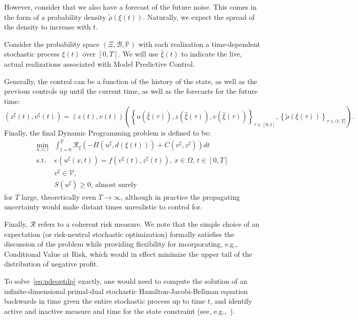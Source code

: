 \documentclass{article}
\newcommand{\1}{\mathds{1}}          %
\theoremstyle{definition}
\begin{document}
\begin{sloppypar}
However, consider that we also have a forecast of the future noise. This comes in the form of a probability density $\tilde{\rho}(\xi(t))$. Naturally, we expect the spread of the density to increase with $t$.

Consider the probability space $(\Xi,\mathcal{B},\mathbb{P})$ with each realization a time-dependent stochastic process $\xi(t)$ over $[0,T]$.
 We will use $\hat{\xi}(t)$ to indicate the live, actual realizations associated with Model Predictive Control. 


Generally, the control can be a function of the history of the state, as well as the previous controls up until the current time, as well as the forecasts for the future time:
\[
(z^{\xi}(t),v^{\xi}(t)) = (z(t),v(t))\left(\left\{u(\hat{\xi}(\tau)),z(\hat{\xi}(\tau)),v(\hat{\xi}(\tau))\right\}_{\tau\in[0,t]},\left\{\tilde{\rho}(\xi(\tau))\right\}_{\tau\in(t,T]}\right).
\]
Finally, the final Dynamic Programming problem is defined to be:
\begin{equation}\label{eq:pdeoptdp}
    \begin{array}{rl}
\min\limits_{u,v,z} & \int_{t=0}^T \mathcal{R}_{\xi}\left(-\Pi(u^{\xi},d(\xi(t)))+C(v^{\xi},z^{\xi})\right) dt\\
\text{s.t. } & e(u^{\xi}(x,t)) = f(v^{\xi}(t),z^{\xi}(t)),\, x\in\Omega,\,t\in[0,T]\\ 
& v^{\xi}\in\mathcal{V},\\
& S(u^{\xi})\ge 0,\, \text{almost surely}
    \end{array}
\end{equation}
for $T$ large, theoretically even $T\to\infty$, although in practice the propagating uncertainty would make distant times unrealistic to control for. 


Finally, $\mathcal{R}$ refers to a coherent risk measure. We note that the simple choice of an expectation (or risk-neutral stochastic optimization) formally satisfies the discussion of the problem while providing flexibility for incorporating, e.g., Conditional Value at Risk, which would in effect minimize the upper tail of the distribution of negative profit.

To solve~\eqref{eq:pdeoptdp} exactly, one would need to compute the solution of an infinite-dimensional primal-dual stochastic Hamilton-Jacobi-Bellman equation backwards in time given the entire stochastic process up to time $t$, and identify active and inactive measure and time for the state constraint (see, e.g.,~\cite{peng1992stochastic}). 



\end{sloppypar}
\end{document}
